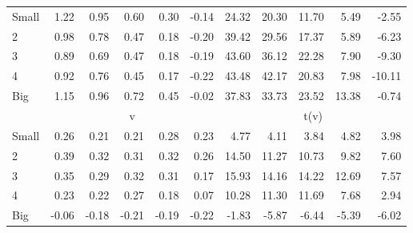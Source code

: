 \begin{table}[!ht]
\begin{tabular}{lrrrrrrrrrr}
    \\
      \cmidrule(r){2-6} \cmidrule(r){7-11}

    Small   & 1.22  & 0.95  & 0.60  & 0.30  & -0.14  & 24.32  & 20.30  & 11.70  & 5.49  & -2.55  \\
         2  & 0.98  & 0.78  & 0.47  & 0.18  & -0.20  & 39.42  & 29.56  & 17.37  & 5.89  & -6.23  \\
         3  & 0.89  & 0.69  & 0.47  & 0.18  & -0.19  & 43.60  & 36.12  & 22.28  & 7.90  & -9.30  \\
         4  & 0.92  & 0.76  & 0.45  & 0.17  & -0.22  & 43.48  & 42.17  & 20.83  & 7.98  & -10.11  \\
    Big     & 1.15  & 0.96  & 0.72  & 0.45  & -0.02  & 37.83  & 33.73  & 23.52  & 13.38  & -0.74  \\

  
    
      & \multicolumn{5}{c}{v} & \multicolumn{5}{c}{t(v)}
    
    \\
      \cmidrule(r){2-6} \cmidrule(r){7-11}

    Small   & 0.26  & 0.21  & 0.21  & 0.28  & 0.23  & 4.77  & 4.11  & 3.84  & 4.82  & 3.98  \\
         2  & 0.39  & 0.32  & 0.31  & 0.32  & 0.26  & 14.50  & 11.27  & 10.73  & 9.82  & 7.60  \\
         3  & 0.35  & 0.29  & 0.32  & 0.31  & 0.17  & 15.93  & 14.16  & 14.22  & 12.69  & 7.57  \\
         4  & 0.23  & 0.22  & 0.27  & 0.18  & 0.07  & 10.28  & 11.30  & 11.69  & 7.68  & 2.94  \\
    Big     & -0.06  & -0.18  & -0.21  & -0.19  & -0.22  & -1.83  & -5.87  & -6.44  & -5.39  & -6.02  \\

  

  \bottomrule
\end{tabular}
\label{tbl:25_Size_Prior_FF1993}
\end{table}
